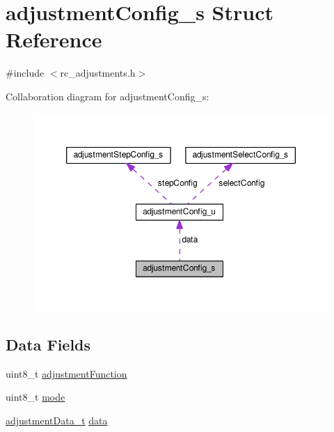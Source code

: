 \hypertarget{structadjustmentConfig__s}{\section{adjustment\+Config\+\_\+s Struct Reference}
\label{structadjustmentConfig__s}
}


{\ttfamily \#include $<$rc\+\_\+adjustments.\+h$>$}



Collaboration diagram for adjustment\+Config\+\_\+s\+:\nopagebreak
\begin{figure}[H]
\begin{center}
\leavevmode
\includegraphics[width=350pt]{structadjustmentConfig__s__coll__graph}
\end{center}
\end{figure}
\subsection*{Data Fields}
\begin{DoxyCompactItemize}
\item 
uint8\+\_\+t \hyperlink{structadjustmentConfig__s_a3ecae146e2ad75635697f33ac069b228}{adjustment\+Function}
\item 
uint8\+\_\+t \hyperlink{structadjustmentConfig__s_a8e109c8d93392133cd6ed2846a3c6be8}{mode}
\item 
\hyperlink{io_2rc__adjustments_8h_a3bc18a710af1c2cb380f2c7c2356756c}{adjustment\+Data\+\_\+t} \hyperlink{structadjustmentConfig__s_a73fc93fee9e72239846c10ed1157889c}{data}
\end{DoxyCompactItemize}


